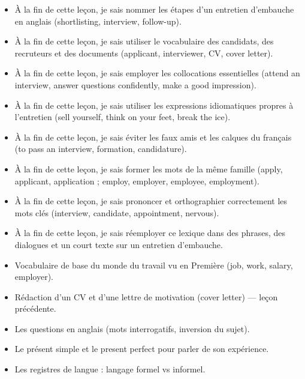 \documentclass[11pt]{article}
\begin{document}
\begin{objectifs}
\begin{itemize}
\item À la fin de cette leçon, je sais nommer les étapes d'un entretien d'embauche en anglais (shortlisting, interview, follow-up).
\item À la fin de cette leçon, je sais utiliser le vocabulaire des candidats, des recruteurs et des documents (applicant, interviewer, CV, cover letter).
\item À la fin de cette leçon, je sais employer les collocations essentielles (attend an interview, answer questions confidently, make a good impression).
\item À la fin de cette leçon, je sais utiliser les expressions idiomatiques propres à l'entretien (sell yourself, think on your feet, break the ice).
\item À la fin de cette leçon, je sais éviter les faux amis et les calques du français (to pass an interview, formation, candidature).
\item À la fin de cette leçon, je sais former les mots de la même famille (apply, applicant, application ; employ, employer, employee, employment).
\item À la fin de cette leçon, je sais prononcer et orthographier correctement les mots clés (interview, candidate, appointment, nervous).
\item À la fin de cette leçon, je sais réemployer ce lexique dans des phrases, des dialogues et un court texte sur un entretien d'embauche.
\end{itemize}
\end{objectifs}

\begin{prerequis}
\begin{itemize}
\item Vocabulaire de base du monde du travail vu en Première (job, work, salary, employer).
\item Rédaction d'un CV et d'une lettre de motivation (cover letter) — leçon précédente.
\item Les questions en anglais (mots interrogatifs, inversion du sujet).
\item Le présent simple et le present perfect pour parler de son expérience.
\item Les registres de langue : langage formel vs informel.
\end{itemize}
\end{prerequis}

\newpage
\end{document}
